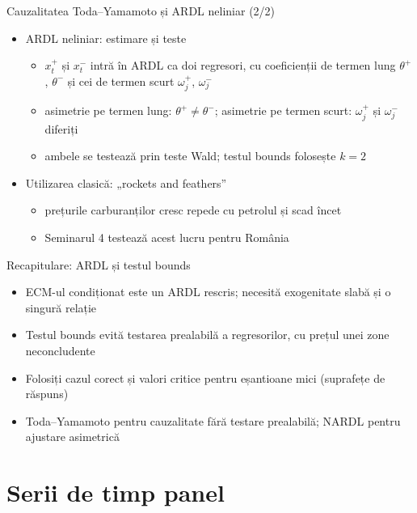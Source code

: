 \begin{frame}{Cauzalitatea Toda--Yamamoto și ARDL neliniar (2/2)}
\itemsize{\small}
\begin{itemize}
    \item ARDL neliniar: estimare și teste
    \begin{itemize}
        \item $x_t^+$ și $x_t^-$ intră în ARDL ca doi regresori, cu coeficienții de termen lung $\theta^+$, $\theta^-$ și cei de termen scurt $\omega_j^+$, $\omega_j^-$
        \item asimetrie pe termen lung: $\theta^+ \ne \theta^-$; asimetrie pe termen scurt: $\omega_j^+$ și $\omega_j^-$ diferiți
        \item ambele se testează prin teste Wald; testul bounds folosește $k = 2$
    \end{itemize}
    \item Utilizarea clasică: „rockets and feathers” 
    \begin{itemize}
        \item prețurile carburanților cresc repede cu petrolul și scad încet
        \item Seminarul 4 testează acest lucru pentru România
    \end{itemize}
\end{itemize}
\end{frame}

\begin{frame}{Recapitulare: ARDL și testul bounds}
\itemsize{\small}
\begin{itemize}
    \item ECM-ul condiționat este un ARDL rescris; necesită exogenitate slabă și o singură relație
    \item Testul bounds evită testarea prealabilă a regresorilor, cu prețul unei zone neconcludente
    \item Folosiți cazul corect și valori critice pentru eșantioane mici (suprafețe de răspuns)
    \item Toda--Yamamoto pentru cauzalitate fără testare prealabilă; NARDL pentru ajustare asimetrică
\end{itemize}
\end{frame}


\section{Serii de timp panel}

